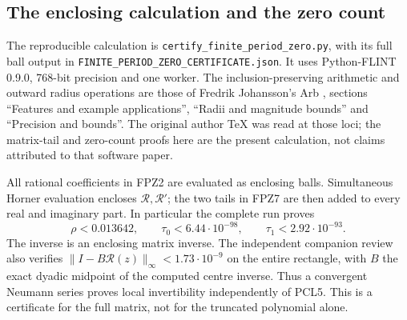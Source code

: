 \subsection{The enclosing calculation and the zero count}
The reproducible calculation is
\texttt{certify\_finite\_period\_zero.py}, with its full ball output in
\texttt{FINITE\_PERIOD\_ZERO\_CERTIFICATE.json}.
It uses Python-FLINT 0.9.0, 768-bit precision and one worker.
The inclusion-preserving arithmetic and outward radius operations are
those of Fredrik Johansson's Arb \cite{human:arb2016}, sections
``Features and example applications'', ``Radii and magnitude bounds''
and ``Precision and bounds''. The original author TeX was read at
those loci; the matrix-tail and zero-count proofs here are the present
calculation, not claims attributed to that software paper.

All rational coefficients in FPZ2 are evaluated as enclosing balls.
Simultaneous Horner evaluation encloses $\mathcal R,\mathcal R'$;
the two tails in FPZ7 are then added to every real and imaginary part.
In particular the complete run proves
\[
 \rho<0.013642,\qquad \tau_0<6.44\cdot10^{-98},\qquad
 \tau_1<2.92\cdot10^{-93}.
 \tag{FPZ8}
\]
The inverse is an enclosing matrix inverse. The independent companion
review also verifies $\|I-B\mathcal R(z)\|_\infty<1.73\cdot10^{-9}$
on the entire rectangle, with $B$ the exact dyadic midpoint of the
computed centre inverse. Thus a convergent Neumann series proves local
invertibility independently of PCL5. This is a certificate for the
full matrix, not for the truncated polynomial alone.

